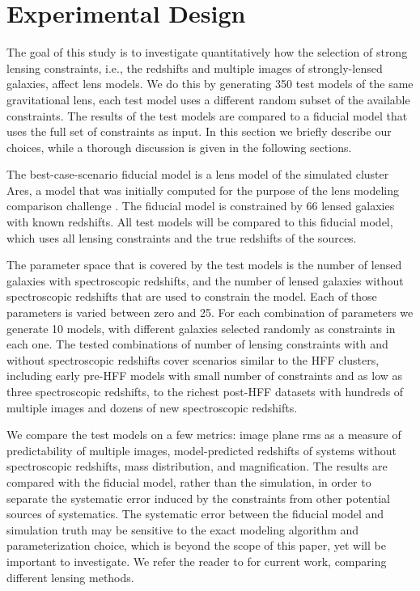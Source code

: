 \section{Experimental Design}
\label{chap3:sec:experimental_design}
The goal of this study is to investigate quantitatively how the selection of strong lensing constraints, i.e., the redshifts and multiple images of strongly-lensed galaxies, affect lens models. We do this by generating 350 test models of the same gravitational lens, each test model uses a different random subset of the available constraints. The results of the test models are compared to a fiducial model that uses the full set of constraints as input. In this section we briefly describe our choices, while a thorough discussion is given in the following sections. 

The best-case-scenario fiducial model is a lens model of the simulated cluster Ares, a model that was initially computed for the purpose of the lens modeling comparison challenge \citep{Meneghetti:2016xe}. The fiducial model is constrained by 66 lensed galaxies with known redshifts. All test models will be compared to this fiducial model, which uses all lensing constraints and the true redshifts of the sources.

The parameter space that is covered by the test models is the number of lensed galaxies with spectroscopic redshifts, and the number of lensed galaxies without spectroscopic redshifts that are used to constrain the model. Each of those parameters is varied between zero and 25. For each combination of parameters we generate 10 models, with different galaxies selected randomly as constraints in each one. The tested combinations of number of lensing constraints with and without spectroscopic redshifts  cover scenarios similar to the HFF clusters, including early pre-HFF models with small number of constraints and as low as three spectroscopic redshifts, to the richest post-HFF datasets with hundreds of multiple images and dozens of new spectroscopic redshifts. 

We compare the test models on a few metrics: image plane rms as a measure of predictability of multiple images, model-predicted redshifts of systems without spectroscopic redshifts, mass distribution, and magnification. The results are compared with the fiducial model, rather than the simulation, in order to separate the systematic error induced by the constraints from other potential sources of systematics. The systematic error between the fiducial model and simulation truth may be sensitive to the exact modeling algorithm and parameterization choice, which is beyond the scope of this paper, yet will be important to investigate. We refer the reader to \citet{Meneghetti:2016xe} for current work, comparing different lensing methods. 


